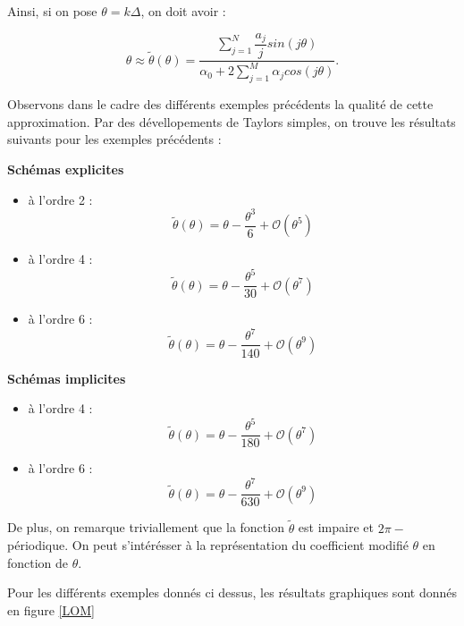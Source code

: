 \documentclass[10pt,a4paper]{amsart}
\begin{document}
Ainsi, si on pose $\theta = k \Delta$, on doit avoir :

\begin{equation}\label{nombre d'onde approché}
\theta \approx \tilde{\theta} \left( \theta \right) = \dfrac{\sum_{j=1}^{N} \dfrac{a_j}{j} sin\left( j \theta \right) }{  \alpha_0 + 2 \sum_{j=1}^{M} \alpha_j cos \left( j \theta \right) }.
\end{equation}

Observons dans le cadre des différents exemples précédents la qualité de cette approximation.
Par des dévellopements de Taylors simples, on trouve les résultats suivants pour les exemples précédents :



\textbf{Schémas explicites}
   
\begin{itemize}
\item à l'ordre 2 :
$$\tilde{\theta}(\theta) = \theta - \dfrac{\theta^3}{6} + \mathcal{O} \left( \theta^5 \right)$$

\item à l'ordre 4 :
$$\tilde{\theta}(\theta) = \theta - \dfrac{\theta^5}{30} + \mathcal{O} \left( \theta^7 \right)$$

\item à l'ordre 6 :
$$\tilde{\theta}(\theta) = \theta - \dfrac{\theta^7}{140} + \mathcal{O} \left( \theta^9 \right)$$

\end{itemize}
   
\textbf{Schémas implicites}
   
\begin{itemize}
\item à l'ordre 4 :
$$\tilde{\theta}(\theta) = \theta - \dfrac{\theta^5}{180} + \mathcal{O} \left( \theta^7 \right)$$

\item à l'ordre 6 :
$$\tilde{\theta}(\theta) = \theta - \dfrac{\theta^7}{630} + \mathcal{O} \left( \theta^9 \right)$$
\end{itemize}

De plus, on remarque triviallement que la fonction $\tilde{\theta}$ est impaire et $2 \pi-$périodique. On peut s'intérésser à la représentation du coefficient modifié $\theta$ en fonction de $\theta$.

Pour les différents exemples donnés ci dessus, les résultats graphiques sont donnés en figure \ref{LOM}
\end{document}
